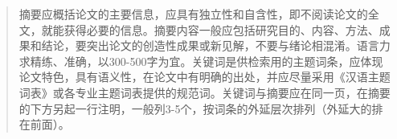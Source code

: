 

\begin{abstract}
  摘要应概括论文的主要信息，应具有独立性和自含性，即不阅读论文的全文，就能获得必要的信息。摘要内容一般应包括研究目的、内容、方法、成果和结论，要突出论文的创造性成果或新见解，不要与绪论相混淆。语言力求精练、准确，以300-500字为宜。关键词是供检索用的主题词条，应体现论文特色，具有语义性，在论文中有明确的出处，并应尽量采用《汉语主题词表》或各专业主题词表提供的规范词。关键词与摘要应在同一页，在摘要的下方另起一行注明，一般列3-5个，按词条的外延层次排列（外延大的排在前面）。

\end{abstract}
